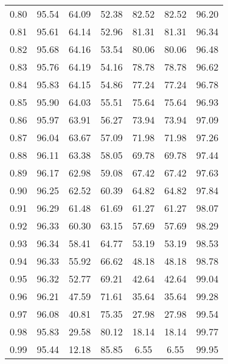 \begin{tabular}{|c|c|c|c|c|c|c|}
      0.80 &     95.54 &     64.09 &      52.38 &   82.52 &      82.52 &         96.20 \\
      0.81 &     95.61 &     64.14 &      52.96 &   81.31 &      81.31 &         96.34 \\
      0.82 &     95.68 &     64.16 &      53.54 &   80.06 &      80.06 &         96.48 \\
      0.83 &     95.76 &     64.19 &      54.16 &   78.78 &      78.78 &         96.62 \\
      0.84 &     95.83 &     64.15 &      54.86 &   77.24 &      77.24 &         96.78 \\
      0.85 &     95.90 &     64.03 &      55.51 &   75.64 &      75.64 &         96.93 \\
      0.86 &     95.97 &     63.91 &      56.27 &   73.94 &      73.94 &         97.09 \\
      0.87 &     96.04 &     63.67 &      57.09 &   71.98 &      71.98 &         97.26 \\
      0.88 &     96.11 &     63.38 &      58.05 &   69.78 &      69.78 &         97.44 \\
      0.89 &     96.17 &     62.98 &      59.08 &   67.42 &      67.42 &         97.63 \\
      0.90 &     96.25 &     62.52 &      60.39 &   64.82 &      64.82 &         97.84 \\
      0.91 &     96.29 &     61.48 &      61.69 &   61.27 &      61.27 &         98.07 \\
      0.92 &     96.33 &     60.30 &      63.15 &   57.69 &      57.69 &         98.29 \\
      0.93 &     96.34 &     58.41 &      64.77 &   53.19 &      53.19 &         98.53 \\
      0.94 &     96.33 &     55.92 &      66.62 &   48.18 &      48.18 &         98.78 \\
      0.95 &     96.32 &     52.77 &      69.21 &   42.64 &      42.64 &         99.04 \\
      0.96 &     96.21 &     47.59 &      71.61 &   35.64 &      35.64 &         99.28 \\
      0.97 &     96.08 &     40.81 &      75.35 &   27.98 &      27.98 &         99.54 \\
      0.98 &     95.83 &     29.58 &      80.12 &   18.14 &      18.14 &         99.77 \\
      0.99 &     95.44 &     12.18 &      85.85 &    6.55 &       6.55 &         99.95 \\
\bottomrule
\end{tabular}
